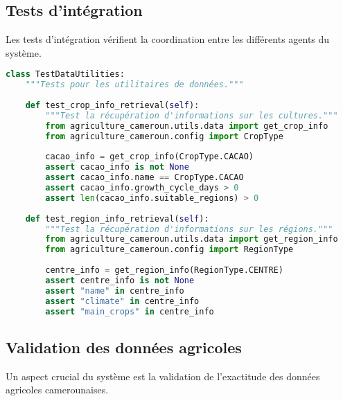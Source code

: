 \subsection{Tests d'intégration}

Les tests d'intégration vérifient la coordination entre les différents agents du système.

\begin{lstlisting}[language=Python, caption=Tests d'intégration des données (tests/test\_agents.py)]
class TestDataUtilities:
    """Tests pour les utilitaires de données."""
    
    def test_crop_info_retrieval(self):
        """Test la récupération d'informations sur les cultures."""
        from agriculture_cameroun.utils.data import get_crop_info
        from agriculture_cameroun.config import CropType
        
        cacao_info = get_crop_info(CropType.CACAO)
        assert cacao_info is not None
        assert cacao_info.name == CropType.CACAO
        assert cacao_info.growth_cycle_days > 0
        assert len(cacao_info.suitable_regions) > 0
    
    def test_region_info_retrieval(self):
        """Test la récupération d'informations sur les régions."""
        from agriculture_cameroun.utils.data import get_region_info
        from agriculture_cameroun.config import RegionType
        
        centre_info = get_region_info(RegionType.CENTRE)
        assert centre_info is not None
        assert "name" in centre_info
        assert "climate" in centre_info
        assert "main_crops" in centre_info
\end{lstlisting}

\subsection{Validation des données agricoles}

Un aspect crucial du système est la validation de l'exactitude des données agricoles camerounaises.

